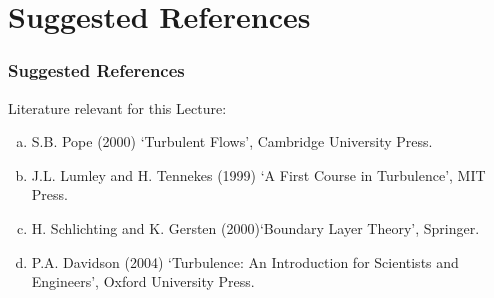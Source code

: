 \documentclass[10pt,compress,handout,ignorenonframetext]{beamer}
\begin{document}
\section{Suggested References}


\begin{frame}
 \frametitle{Suggested References}
  Literature relevant for this Lecture:
  \begin{enumerate}[(a)]%
   \item S.B. Pope (2000) `Turbulent Flows', Cambridge University Press.
   \item J.L. Lumley and H. Tennekes (1999) `A First Course in Turbulence', MIT Press.
   \item H. Schlichting and K. Gersten (2000)`Boundary Layer Theory', Springer.
   \item P.A. Davidson (2004) `Turbulence: An Introduction for Scientists and Engineers', Oxford University Press.
  \end{enumerate}
\end{frame}
\end{document}
